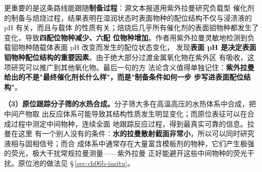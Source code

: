 更重要的是这条路线能跟随\textbf{制备过程}：源文本报道用紫外拉曼研究负载型  催化剂
的制备与焙烧过程，结果表明在湿润状态时表面物种的配位结构不仅与浸渍液的 pH 有关，而且与载体
的性质有关；焙烧后几乎所有催化剂的表面钼物种都发生了变化，导致\textbf{四配位物种减少、六配
位物种增加}。作者用紫外拉曼灵敏地检测到负载钼物种随载体表面 pH 改变而发生的配位状态变化，
发现\textbf{表面 pH 是决定表面钼物种配位结构的重要因素}。由于绝大部分过渡金属氧化物在紫外区
有吸收，这项研究可以推广到其他氧化物。最后一句的方
法论含义值得单独记住：\textbf{紫外拉曼给出的不是"最终催化剂长什么样"，而是"制备条件如何一步
步写进表面配位结构"}。

\textbf{（3）原位跟踪分子筛的水热合成。}分子筛大多在高温高压的水热体系中合成，把中间产物取
出反应体系可能导致其结构性质发生明显变化；而原位表征可以在合成过程中测定中间物种，连续全面
地跟踪反应过程，得到最真实可靠的信息。拉曼在这里
有一个别人没有的条件：\textbf{水的拉曼散射截面非常小}，所以可以同时研究液相与固相信号；而合
成体系中通常存在大量富含模板剂的物种，它们产生极强的荧光，极大干扰常规拉曼测量——紫外拉曼
正好能避开这些中间物种的荧光干扰。原位池的做法见
\S\,\ref{sec:ch06b-insitu}。


